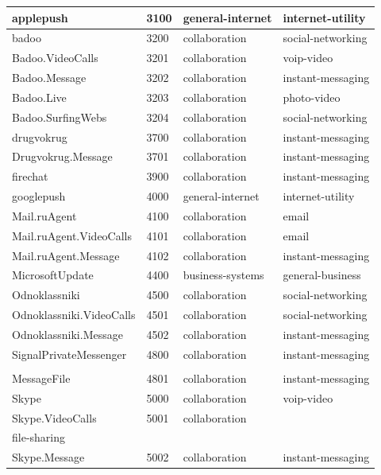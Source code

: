 \begin{longtable}{p{}|p{}|p{}|p{}}
    applepush &	3100 &	general-internet &	internet-utility \\ \hline
    badoo &	3200 &	collaboration &	social-networking \\ \hline
    Badoo.VideoCalls &	3201 &	collaboration &	voip-video \\ \hline
    Badoo.Message &	3202 &	collaboration &	instant-messaging \\ \hline
    Badoo.Live &	3203 &	collaboration &	photo-video \\ \hline
    Badoo.SurfingWebs &	3204 &	collaboration &	social-networking \\ \hline
    drugvokrug &	3700 &	collaboration &	instant-messaging \\ \hline
    Drugvokrug.Message &	3701 &	collaboration &	instant-messaging \\ \hline
    firechat &	3900 &	collaboration &	instant-messaging \\ \hline
    googlepush &	4000 &	general-internet &	internet-utility \\ \hline
    Mail.ruAgent &	4100 &	collaboration &	email \\ \hline
    Mail.ruAgent.VideoCalls &	4101 &	collaboration &	email \\ \hline
    Mail.ruAgent.Message &	4102 &	collaboration &	instant-messaging \\ \hline
    MicrosoftUpdate &	4400 &	business-systems &	general-business \\ \hline
    Odnoklassniki &	4500 &	collaboration &	social-networking \\ \hline
    Odnoklassniki.VideoCalls &	4501 &	collaboration &	social-networking \\ \hline
    Odnoklassniki.Message &	4502 &	collaboration &	instant-messaging \\ \hline
    SignalPrivateMessenger &	4800 &	collaboration &	instant-messaging \\ \hline
    \tabincell{l}{SignalPrivateMessenger.\\MessageFile} &	4801 &	collaboration &	instant-messaging \\ \hline
    Skype &	5000 &	collaboration &	voip-video \\ \hline
    Skype.VideoCalls &	5001 &	collaboration &	\tabincell{l}{voip-video\\
                                                              file-sharing} \\ \hline
    Skype.Message &	5002 &	collaboration &	instant-messaging \\ \hline

\end{longtable}
